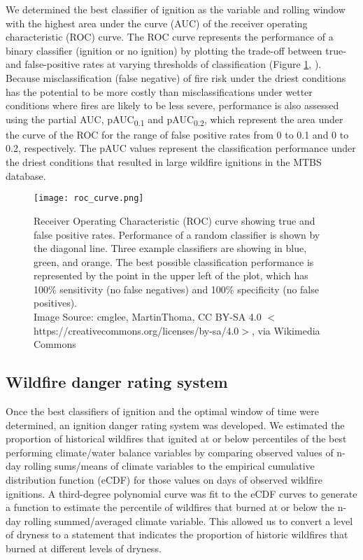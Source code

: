 \documentclass[11p]{article}
\newcommand{\pauc}[1]{pAUC\textsubscript{#1}}
\begin{document}
We determined the best classifier of ignition as the variable and rolling window with the highest area under the curve (AUC) of the receiver operating characteristic (ROC) curve. The ROC curve represents the performance of a binary classifier (ignition or no ignition) by plotting the trade-off between true- and false-positive rates at varying thresholds of classification (Figure \ref{fig:roc}, \citet{pontiusRecommendationsUsingRelative2014}). Because misclassification (false negative) of fire risk under the driest conditions has the potential to be more costly than misclassifications under wetter conditions where fires are likely to be less severe, performance is also assessed using the partial AUC, \pauc{0.1} and \pauc{0.2}, which represent the area under the curve of the ROC for the range of false positive rates from 0 to 0.1 and 0 to 0.2, respectively. The pAUC values represent the classification performance under the driest conditions that resulted in large wildfire ignitions in the MTBS database.   

\begin{figure}[htbp]
  \centering
  \texttt{[image: roc\_curve.png]}
  \caption{Receiver Operating Characteristic (ROC) curve showing true and false positive rates. Performance of a random classifier is shown by the diagonal line. Three example classifiers are showing in blue, green, and orange. The best possible classification performance is represented by the point in the upper left of the plot, which has 100\% sensitivity (no false negatives) and 100\% specificity (no false positives). \\ Image Source: cmglee, MartinThoma, CC BY-SA 4.0 $<$https://creativecommons.org/licenses/by-sa/4.0$>$, via Wikimedia Commons}
    \label{fig:roc}
\end{figure}

\subsection{Wildfire danger rating system}

Once the best classifiers of ignition and the optimal window of time were determined, an ignition danger rating system was developed.  We estimated the proportion of historical wildfires that ignited at or below percentiles of the best performing climate/water balance variables by comparing observed values of n-day rolling sums/means of climate variables to the empirical cumulative distribution function (eCDF) for those values on days of observed wildfire ignitions. A third-degree polynomial curve was fit to the eCDF curves to generate a function to estimate the percentile of wildfires that burned at or below the n-day rolling summed/averaged climate variable. This allowed us to convert a level of dryness to a statement that indicates the proportion of historic wildfires that burned at different levels of dryness. 
\end{document}
